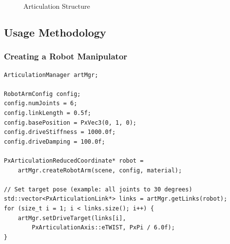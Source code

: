 \begin{figure}[h]
\centering
{}
\caption{Articulation Structure}
\end{figure}


\subsection{Usage Methodology}

\subsubsection{Creating a Robot Manipulator}

\begin{lstlisting}[caption={6-DOF robot arm}]
ArticulationManager artMgr;

RobotArmConfig config;
config.numJoints = 6;
config.linkLength = 0.5f;
config.basePosition = PxVec3(0, 1, 0);
config.driveStiffness = 1000.0f;
config.driveDamping = 100.0f;

PxArticulationReducedCoordinate* robot =
    artMgr.createRobotArm(scene, config, material);

// Set target pose (example: all joints to 30 degrees)
std::vector<PxArticulationLink*> links = artMgr.getLinks(robot);
for (size_t i = 1; i < links.size(); i++) {
    artMgr.setDriveTarget(links[i],
        PxArticulationAxis::eTWIST, PxPi / 6.0f);
}
\end{lstlisting}

